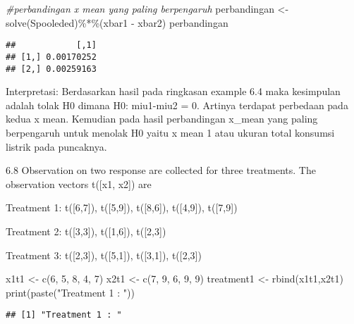 \documentclass[
]{article}
\newenvironment{Shaded}{\begin{snugshade}}{\end{snugshade}}
\newcommand{\CommentTok}[1]{\textcolor[rgb]{0.56,0.35,0.01}{\textit{#1}}}
\newcommand{\DecValTok}[1]{\textcolor[rgb]{0.00,0.00,0.81}{#1}}
\newcommand{\FunctionTok}[1]{\textcolor[rgb]{0.00,0.00,0.00}{#1}}
\newcommand{\NormalTok}[1]{#1}
\newcommand{\OtherTok}[1]{\textcolor[rgb]{0.56,0.35,0.01}{#1}}
\newcommand{\SpecialCharTok}[1]{\textcolor[rgb]{0.00,0.00,0.00}{#1}}
\newcommand{\StringTok}[1]{\textcolor[rgb]{0.31,0.60,0.02}{#1}}
\begin{document}
\begin{Shaded}
\begin{Highlighting}[]
\CommentTok{\#perbandingan x mean yang paling berpengaruh }
\NormalTok{perbandingan }\OtherTok{\textless{}{-}} \FunctionTok{solve}\NormalTok{(Spooleded)}\SpecialCharTok{\%*\%}\NormalTok{(xbar1 }\SpecialCharTok{{-}}\NormalTok{ xbar2)}
\NormalTok{perbandingan}
\end{Highlighting}
\end{Shaded}

\begin{verbatim}
##            [,1]
## [1,] 0.00170252
## [2,] 0.00259163
\end{verbatim}

Interpretasi: Berdasarkan hasil pada ringkasan example 6.4 maka
kesimpulan adalah tolak H0 dimana H0: miu1-miu2 = 0. Artinya terdapat
perbedaan pada kedua x mean. Kemudian pada hasil perbandingan x\_mean
yang paling berpengaruh untuk menolak H0 yaitu x mean 1 atau ukuran
total konsumsi listrik pada puncaknya.

6.8 Observation on two response are collected for three treatments. The
observation vectors t({[}x1, x2{]}) are

Treatment 1: t({[}6,7{]}), t({[}5,9{]}), t({[}8,6{]}), t({[}4,9{]}),
t({[}7,9{]})

Treatment 2: t({[}3,3{]}), t({[}1,6{]}), t({[}2,3{]})

Treatment 3: t({[}2,3{]}), t({[}5,1{]}), t({[}3,1{]}), t({[}2,3{]})

\begin{Shaded}
\begin{Highlighting}[]
\NormalTok{x1t1 }\OtherTok{\textless{}{-}} \FunctionTok{c}\NormalTok{(}\DecValTok{6}\NormalTok{, }\DecValTok{5}\NormalTok{, }\DecValTok{8}\NormalTok{, }\DecValTok{4}\NormalTok{, }\DecValTok{7}\NormalTok{)}
\NormalTok{x2t1 }\OtherTok{\textless{}{-}} \FunctionTok{c}\NormalTok{(}\DecValTok{7}\NormalTok{, }\DecValTok{9}\NormalTok{, }\DecValTok{6}\NormalTok{, }\DecValTok{9}\NormalTok{, }\DecValTok{9}\NormalTok{)}
\NormalTok{treatment1 }\OtherTok{\textless{}{-}} \FunctionTok{rbind}\NormalTok{(x1t1,x2t1)}
\FunctionTok{print}\NormalTok{(}\FunctionTok{paste}\NormalTok{(}\StringTok{"Treatment 1 : "}\NormalTok{))}
\end{Highlighting}
\end{Shaded}

\begin{verbatim}
## [1] "Treatment 1 : "
\end{verbatim}
\end{document}
